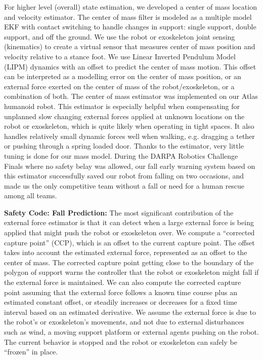 \documentclass[letterpaper,12pt,fullpage]{article}
\begin{document}
For higher level (overall) state estimation,
we developed a center of mass location and velocity estimator.
The center of mass filter is modeled as a multiple model EKF with contact switching
to handle changes in support: single support, double support, and off the ground.
We use the robot or exoskeleton
joint sensing (kinematics) to create a virtual sensor that measures
center of mass position and velocity relative to a stance foot.
We use Linear
Inverted Pendulum Model (LIPM) dynamics with an offset to predict
the center of mass motion. This offset can be interpreted
as a modelling error on the center of mass position, or an
external force exerted on the center of mass of the robot/exoskeleton,
or a combination of both. The center of mass estimator was
implemented on our Atlas humanoid robot. 
This estimator is especially helpful when compensating
for unplanned slow changing external forces applied at
unknown locations on the robot or exoskeleton, which is quite likely when
operating in tight spaces. It also handles relatively small
dynamic forces well when walking, e.g. dragging a tether
or pushing through a spring loaded door. Thanks to
the estimator, very little tuning is done for our mass model.
During the DARPA
Robotics Challenge Finals
where no safety belay was
allowed, our fall early warning system based on this estimator
successfully saved our robot from
falling on two occasions, and made us the only competitive team
without a fall or need for a human rescue among all teams.

{\bf Safety Code: Fall Prediction:}
The most significant contribution of the external force estimator is that it
can detect when a large external force is being applied that might
push the robot or exoskeleton over.
We compute a ``corrected capture point'' (CCP),
which is an offset to the current capture point.
The offset 
takes into account the estimated external force, represented as an offset
to the center of mass.
The corrected capture point getting close to the boundary of the polygon of
support warns the controller that the robot or exoskeleton might fall if the external
force is maintained.
We can also compute the corrected capture point assuming that the
external force follows a known time course plus an estimated constant offset,
or steadily increases or decreases for a fixed time interval
based on an estimated derivative.
We assume the external force is due to the robot's or exoskeleton's
movements, and not
due to external disturbances such as wind, a moving support platform
or external agents pushing on the robot.
The current
behavior is stopped and the robot or exoskeleton can safely be ``frozen'' in place.
\end{document}
